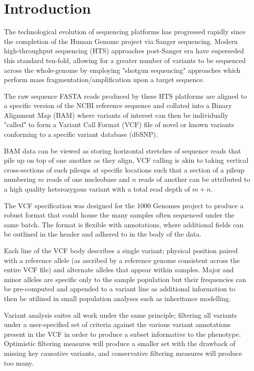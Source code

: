 
\section{Introduction}

\enlargethispage{30pt}

The technological evolution of sequencing platforms has progressed rapidly since the completion of the Human Genome project via Sanger sequencing. Modern high-throughput sequencing (HTS) approaches post-Sanger era have superseded this standard ten-fold, allowing for a greater number of variants to be sequenced across the whole-genome by employing "shotgun sequencing" approaches which perform mass fragmentation/amplification upon a target sequence.

The raw sequence FASTA reads produced by these HTS platforms are aligned to a specific version of the NCBI reference sequence and collated into a Binary Alignment Map (BAM) where variants of interest can then be individually "called" to form a Variant Call Format (VCF) file of novel or known variants conforming to a specific variant database (dbSNP).

BAM data can be viewed as storing horizontal stretches of sequence reads that pile up on top of one another as they align, VCF calling is akin to taking vertical cross-sections of such pileups at specific locations such that a section of a pileup numbering $m$ reads of one nucleobase and $n$ reads of another can be attributed to a high quality heterozygous variant with a total read depth of $m + n$.

The VCF specification was designed for the 1000 Genomes project to produce a robust format that could house the many samples often sequenced under the same batch. The format is flexible with annotations, where additional fields can be outlined in the header and adhered to in the body of the data. 

Each line of the VCF body describes a single variant; physical position paired with a reference allele (as ascribed by a reference genome consistent across the entire VCF file) and alternate alleles that appear within samples. Major and minor alleles are specific only to the sample population but their frequencies can be pre-computed and appended to a variant line as additional information to then be utilized in small population analyses such as inheritance modelling.

Variant analysis suites all work under the same principle; filtering all variants under a user-specified set of criteria against the various variant annotations present in the VCF in order to produce a subset informative to the phenotype. Optimistic filtering measures will produce a smaller set with the drawback of missing key causative variants, and conservative filtering measures will produce too many. 

